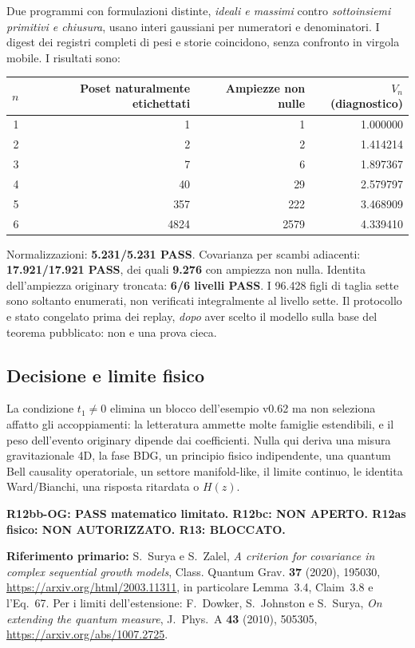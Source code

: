 \documentclass[11pt,a4paper]{article}
\begin{document}
Due programmi con formulazioni distinte, \emph{ideali e massimi} contro \emph{sottoinsiemi primitivi e chiusura}, usano interi gaussiani per numeratori e denominatori. I digest dei registri completi di pesi e storie coincidono, senza confronto in virgola mobile. I risultati sono:
\begin{center}
\small
\begin{tabular}{rrrr}
\toprule
$n$ & Poset naturalmente etichettati & Ampiezze non nulle & $V_n$ (diagnostico)\\
\midrule
1 & 1 & 1 & 1.000000\\
2 & 2 & 2 & 1.414214\\
3 & 7 & 6 & 1.897367\\
4 & 40 & 29 & 2.579797\\
5 & 357 & 222 & 3.468909\\
6 & 4824 & 2579 & 4.339410\\
\bottomrule
\end{tabular}
\end{center}
Normalizzazioni: \textbf{5.231/5.231 PASS}. Covarianza per scambi adiacenti: \textbf{17.921/17.921 PASS}, dei quali \textbf{9.276} con ampiezza non nulla. Identita dell'ampiezza originary troncata: \textbf{6/6 livelli PASS}. I 96.428 figli di taglia sette sono soltanto enumerati, non verificati integralmente al livello sette. Il protocollo e stato congelato prima dei replay, \emph{dopo} aver scelto il modello sulla base del teorema pubblicato: non e una prova cieca.

\subsection*{Decisione e limite fisico}
La condizione $t_1\ne0$ elimina un blocco dell'esempio v0.62 ma non seleziona affatto gli accoppiamenti: la letteratura ammette molte famiglie estendibili, e il peso dell'evento originary dipende dai coefficienti. Nulla qui deriva una misura gravitazionale 4D, la fase BDG, un principio fisico indipendente, una quantum Bell causality operatoriale, un settore manifold-like, il limite continuo, le identita Ward/Bianchi, una risposta ritardata o $H(z)$.\par
\textbf{R12bb-OG: PASS matematico limitato. R12bc: NON APERTO. R12as fisico: NON AUTORIZZATO. R13: BLOCCATO.}

\medskip
\textbf{Riferimento primario:} S.~Surya e S.~Zalel, \emph{A criterion for covariance in complex sequential growth models}, Class. Quantum Grav. \textbf{37} (2020), 195030, \url{https://arxiv.org/html/2003.11311}, in particolare Lemma~3.4, Claim~3.8 e l'Eq.~67. Per i limiti dell'estensione: F.~Dowker, S.~Johnston e S.~Surya, \emph{On extending the quantum measure}, J.~Phys.~A \textbf{43} (2010), 505305, \url{https://arxiv.org/abs/1007.2725}.
\end{document}
